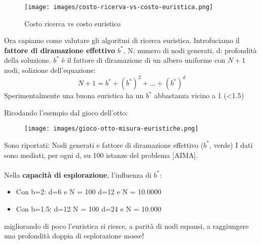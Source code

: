 \begin{figure}[h!]
    \centering
    \texttt{[image: images/costo-ricerva-vs-costo-euristica.png]}
    \caption{Costo ricerca vs costo euristico}
\end{figure}
\hspace{-15pt}Ora capiamo come valutare gli algoritmi di ricerca euristica. Introfuciamo
il \textbf{fattore di diramazione effettivo} $b^*$, N: numero di nodi generati, d: profondità della soluzione.
$b^*$ è il fattore di diramazione di un albero uniforme con $N+1$ nodi, solizione dell'equazione:
$$N + 1 = b^* + (b^*)^2 + \dots + (b^*)^d$$
Sperimentalmente una buona euristica ha un $b^*$ abbastanza vicino a 1 (<1.5)
\begin{example}
    Ricodando l'esempio dal gioco dell'otto:
    \begin{figure}[h!]
        \centering
        \texttt{[image: images/gioco-otto-misura-euristiche.png]}
    \end{figure}
    Sono riportati: Nodi generati e fattore di diramazione effettivo ($b^*$, verde)
    I dati sono mediati, per ogni d, su 100 istanze del problema [AIMA].\\\\
    Nella \textbf{capacità di esplorazione}, l'influenza di $b^*$:
    \begin{itemize}
        \item Con b=2: d=6 e N = 100 \hspace{15pt} d=12 e N = 10.0000
        \item Con b=1.5: d=12 N = 100 \hspace{15pt} d=24 e N = 10.000
    \end{itemize}
    migliorando di poco l’euristica si riesce, a parità di nodi espansi, a raggiungere una profondità doppia di esplorazione mosse!
\end{example}

